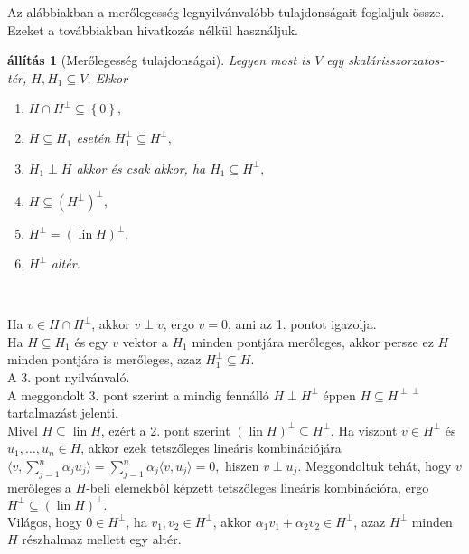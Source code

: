 \documentclass[a4paper, showtrims]{memoir}
\makeatletter
\renewenvironment{proof}[1][\proofname]
    {\par\pushQED{\qed}%
    \normalfont \topsep6\p@\@plus6\p@\relax
    \trivlist
    \item[\hskip\labelsep
        \itshape
    #1\@addpunct{:}]\ignorespaces}
    {\popQED\endtrivlist\@endpefalse}
\theoremstyle{plain}
\newtheorem{proposition}{állítás}[chapter]
\theoremstyle{remark}
\theoremstyle{definition}
\DeclareMathOperator{\lin}{lin}
\newcommand{\ip}[2]{\langle#1,#2\rangle}
\makeatother
\begin{document}
Az alábbiakban a merőlegesség legnyilvánvalóbb tulajdonságait foglaljuk össze.
Ezeket a továbbiakban hivatkozás nélkül használjuk.
\begin{proposition}[Merőlegesség tulajdonságai]
	Legyen most is $V$ egy skalárisszorzatos-tér, $H,H_1\subseteq V$.
	Ekkor
	\begin{enumerate}
		\item $H\cap H^{\perp}\subseteq\left\{ 0 \right\},$
		\item $H\subseteq H_1$ esetén $H_1^\perp\subseteq H^\perp,$
        \item $H_1\perp H$ akkor és csak akkor, ha $H_1\subseteq H^\perp,$
		\item $H\subseteq \left( H^\perp \right)^\perp,$
		\item $H^{\perp}=\left( \lin H \right)^\perp,$
		\item $H^\perp$ altér.\qedhere
	\end{enumerate}
\end{proposition}\
\begin{proof}
	Ha $v\in H\cap H^\perp$, akkor $v\perp v$, ergo $v=0$, ami az 1. pontot igazolja.
\\
	Ha $H\subseteq H_1$ és egy $v$ vektor a $H_1$ minden pontjára merőleges, 
    akkor persze ez $H$ minden pontjára is merőleges, azaz $H_1^\perp\subseteq H$.
\\
    A 3. pont nyilvánvaló.
\\
    A meggondolt 3. pont szerint a mindig fennálló $H\perp H^\perp$ éppen $H\subseteq H^{\perp\perp}$
    tartalmazást jelenti.
\\
    Mivel $H\subseteq \lin H$, ezért a 2. pont szerint $(\lin H)^\perp\subseteq H^\perp$.
	Ha viszont $v\in H^\perp$ és $u_1,\ldots,u_n\in H$, akkor ezek tetszőleges lineáris kombinációjára
	\begin{math}
		\ip{v}{\sum_{j=1}^n\alpha_ju_j}
		=
		\sum_{j=1}^n\alpha_j\ip{v}{u_j}
		=
		0,
	\end{math}
	hiszen $v\perp u_j$.
	Meggondoltuk tehát, hogy $v$ merőleges a $H$-beli elemekből képzett tetszőleges lineáris kombinációra,
	ergo $H^\perp\subseteq\left( \lin H \right)^\perp.$
    \\
	Világos, hogy $0\in H^\perp$, ha $v_1,v_2\in H^\perp$, akkor $\alpha_1v_1+\alpha_2v_2\in H^\perp$, azaz
	$H^\perp$ minden $H$ részhalmaz mellett egy altér.
\end{proof}
\end{document}
